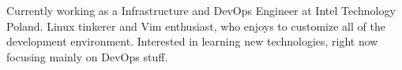 
\begin{cvparagraph}
Currently working as a Infrastructure and DevOps Engineer at Intel Technology Poland. Linux tinkerer and Vim enthusiast, who enjoys to customize all of the development environment. Interested in learning new technologies, right now focusing mainly on DevOps stuff.
\end{cvparagraph}
